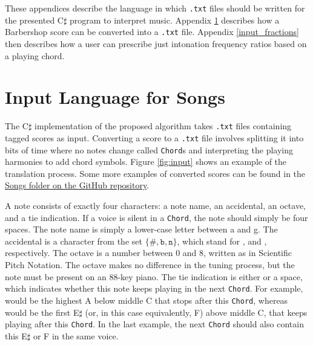 \documentclass[a4paper]{article}
\begin{document}
\begin{appendices}
These appendices describe the language in which \texttt{.txt} files should be written for the presented C$\sharp$ program to interpret music. Appendix \ref{input_songs} describes how a Barbershop score can be converted into a \texttt{.txt} file. Appendix \ref{input_fractions} then describes how a user can prescribe just intonation frequency ratios based on a playing chord.

\section{Input Language for Songs}
\label{input_songs}
The C$\sharp$ implementation of the proposed algorithm takes \texttt{.txt} files containing tagged scores as input. Converting a score to a \texttt{.txt} file involves splitting it into bits of time where no notes change called \texttt{Chord}s and interpreting the playing harmonies to add chord symbols. Figure \ref{fig:input} shows an example of the translation process. Some more examples of converted scores can be found in the \href{https://github.com/teuncb/AdaptiveBarbershop/tree/main/Songs}{Songs folder on the GitHub repository}.

A note consists of exactly four characters: a note name, an accidental, an octave, and a tie indication. If a voice is silent in a \texttt{Chord}, the note should simply be four spaces. The note name is simply a lower-case letter between a and g. The accidental is a character from the set $\{\texttt{\#}, \texttt{b}, \texttt{n}\}$, which stand for ,  and , respectively. The octave is a number between 0 and 8, written as in Scientific Pitch Notation. \cite{pollens_pitch_2022} The octave makes no difference in the tuning process, but the note must be present on an 88-key piano. The tie indication is either  or a space, which indicates whether this note keeps playing in the next \texttt{Chord}. For example,  would be the highest A below middle C that stops after this \texttt{Chord}, whereas  would be the first E$\sharp$ (or, in this case equivalently, F) above middle C, that keeps playing after this \texttt{Chord}. In the last example, the next \texttt{Chord} should also contain this E$\sharp$ or F in the same voice.


\end{appendices}
\end{document}

